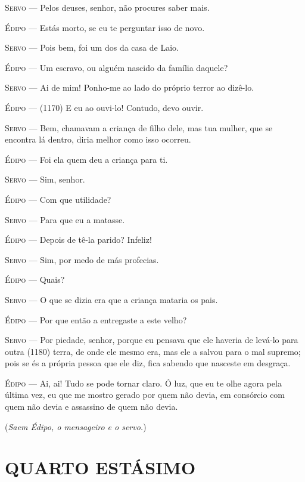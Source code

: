 \textsc{Servo} --- Pelos deuses, senhor, não procures saber mais.

\textsc{Édipo} --- Estás morto, se eu te perguntar isso de novo.

\textsc{Servo} --- Pois bem, foi um dos da casa de Laio.

\textsc{Édipo} --- Um escravo, ou alguém nascido da família daquele?

\textsc{Servo} --- Ai de mim! Ponho-me ao lado do próprio terror ao dizê-lo.

\textsc{Édipo} --- (1170) E eu ao ouvi-lo! Contudo, devo ouvir.

\textsc{Servo} --- Bem, chamavam a criança de filho dele, mas tua mulher, que se encontra
lá dentro, diria melhor como isso ocorreu.

\textsc{Édipo} --- Foi ela quem deu a criança para ti.

\textsc{Servo} --- Sim, senhor.

\textsc{Édipo} --- Com que utilidade?

\textsc{Servo} --- Para que eu a matasse.

\textsc{Édipo} --- Depois de tê-la parido? Infeliz!

\textsc{Servo} --- Sim, por medo de más profecias.

\textsc{Édipo} --- Quais?

\textsc{Servo} --- O que se dizia era que a criança mataria os pais.

\textsc{Édipo} --- Por que então a entregaste a este velho?

\textsc{Servo} --- Por piedade, senhor, porque eu pensava que ele haveria de levá-lo para
outra (1180) terra, de onde ele mesmo era, mas ele a salvou para o mal
supremo; pois se és a própria pessoa que ele diz, fica sabendo que
nasceste em desgraça.

\textsc{Édipo} --- Ai, ai! Tudo se pode tornar claro. Ó luz, que eu te olhe agora pela
última vez, eu que me mostro gerado por quem não devia, em consórcio com
quem não devia e assassino de quem não devia.

(\emph{Saem Édipo, o mensageiro e o servo.})

\section{QUARTO ESTÁSIMO}

